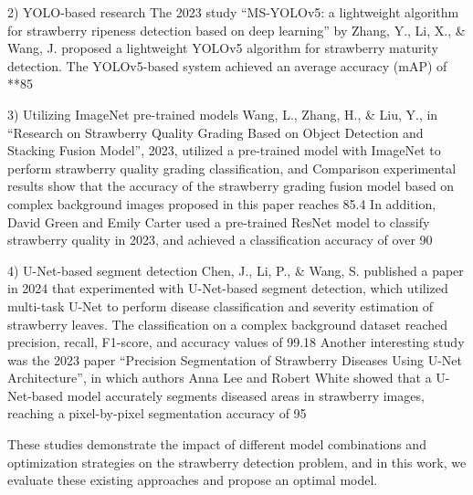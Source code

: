 \documentclass{ws-ijprai}
\begin{document}
2)
YOLO-based research
The 2023 study “MS-YOLOv5: a lightweight algorithm for strawberry ripeness detection based on deep learning” by Zhang, Y., Li, X., & Wang, J. proposed a lightweight YOLOv5 algorithm for strawberry maturity detection. The YOLOv5-based system achieved an average accuracy (mAP) of **85%

3) Utilizing ImageNet pre-trained models
Wang, L., Zhang, H., & Liu, Y., in “Research on Strawberry Quality Grading Based on Object Detection and Stacking Fusion Model”, 2023, utilized a pre-trained model with ImageNet to perform strawberry quality grading classification, and Comparison experimental results show that the accuracy of the strawberry grading fusion model based on complex background images proposed in this paper reaches 85.4%
In addition, David Green and Emily Carter used a pre-trained ResNet model to classify strawberry quality in 2023, and achieved a classification accuracy of over 90%

4) U-Net-based segment detection
Chen, J., Li, P., & Wang, S. published a paper in 2024 that experimented with U-Net-based segment detection, which utilized multi-task U-Net to perform disease classification and severity estimation of strawberry leaves. The classification on a complex background dataset reached precision, recall, F1-score, and accuracy values of 99.18%
Another interesting study was the 2023 paper “Precision Segmentation of Strawberry Diseases Using U-Net Architecture”, in which authors Anna Lee and Robert White showed that a U-Net-based model accurately segments diseased areas in strawberry images, reaching a pixel-by-pixel segmentation accuracy of 95%

These studies demonstrate the impact of different model combinations and optimization strategies on the strawberry detection problem, and in this work, we evaluate these existing approaches and propose an optimal model.
\end{document}
